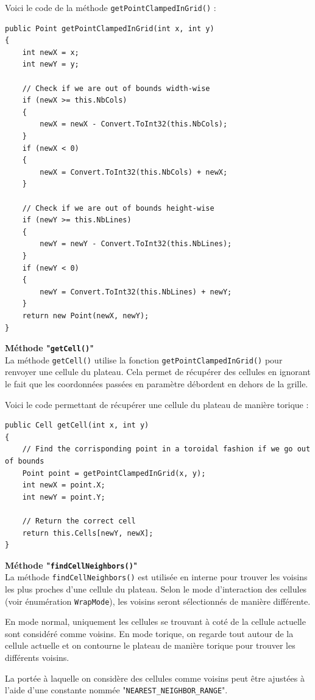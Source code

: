 \documentclass[a4paper]{article}
\begin{document}
Voici le code de la méthode \texttt{getPointClampedInGrid()} :
\begin{lstlisting}
public Point getPointClampedInGrid(int x, int y)
{
    int newX = x;
    int newY = y;

    // Check if we are out of bounds width-wise
    if (newX >= this.NbCols)
    {
        newX = newX - Convert.ToInt32(this.NbCols);
    }
    if (newX < 0)
    {
        newX = Convert.ToInt32(this.NbCols) + newX;
    }

    // Check if we are out of bounds height-wise
    if (newY >= this.NbLines)
    {
        newY = newY - Convert.ToInt32(this.NbLines);
    }
    if (newY < 0)
    {
        newY = Convert.ToInt32(this.NbLines) + newY;
    }
    return new Point(newX, newY);
}
\end{lstlisting}


\pagebreak
\textbf{Méthode "\texttt{getCell()}"}\\
La méthode \texttt{getCell()} utilise la fonction \texttt{getPointClampedInGrid()} pour renvoyer une cellule du plateau. Cela permet de récupérer des cellules en ignorant le fait que les coordonnées passées en paramètre débordent en dehors de la grille.

Voici le code permettant de récupérer une cellule du plateau de manière torique :

\begin{lstlisting}
public Cell getCell(int x, int y)
{
    // Find the corrisponding point in a toroidal fashion if we go out of bounds
    Point point = getPointClampedInGrid(x, y);
    int newX = point.X;
    int newY = point.Y;

    // Return the correct cell
    return this.Cells[newY, newX];
}
\end{lstlisting}


\textbf{Méthode "\texttt{findCellNeighbors()}"}\\
La méthode \texttt{findCellNeighbors()} est utilisée en interne pour trouver les voisins les plus proches d'une cellule du plateau. Selon le mode d'interaction des cellules (voir énumération \texttt{WrapMode}), les voisins seront sélectionnés de manière différente.

En mode normal, uniquement les cellules se trouvant à coté de la cellule actuelle sont considéré comme voisins. En mode torique, on regarde tout autour de la cellule actuelle et on contourne le plateau de manière torique pour trouver les différents voisins.

La portée à laquelle on considère des cellules comme voisins peut être ajustées à l'aide d'une constante nommée "\texttt{NEAREST\_NEIGHBOR\_RANGE}".
\end{document}
